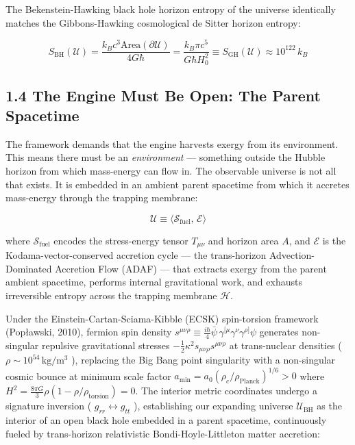 \documentclass[11pt,a4paper]{article}
\theoremstyle{definition}\newtheorem{definition}{Definition}
\theoremstyle{remark}\newtheorem{remark}{Remark}
\begin{document}
The Bekenstein-Hawking black hole horizon entropy of the universe identically matches the Gibbons-Hawking cosmological de Sitter horizon entropy:


\begin{equation}
\boxed{S_{\text{BH}}(\mathcal{U}) = \frac{k_B c^3 \mathrm{Area}(\partial \mathcal{U})}{4 G \hbar} = \frac{k_B \pi c^5}{G \hbar H_0^2} \equiv S_{\text{GH}}(\mathcal{U}) \approx 10^{122} \, k_B}
\end{equation}

\subsection{1.4 The Engine Must Be Open: The Parent Spacetime}

The framework demands that the engine harvests exergy from its environment. This means there must be an \textit{environment} — something outside the Hubble horizon from which mass-energy can flow in. The observable universe is not all that exists. It is embedded in an ambient parent spacetime from which it accretes mass-energy through the trapping membrane:


\begin{equation}
\boxed{\mathcal{U} \equiv \langle \mathcal{S}_{\text{fuel}},\, \mathcal{E} \rangle}
\end{equation}


where $\mathcal{S}_{\text{fuel}}$ encodes the stress-energy tensor $T_{\mu\nu}$ and horizon area $A$, and $\mathcal{E}$ is the Kodama-vector-conserved accretion cycle — the trans-horizon Advection-Dominated Accretion Flow (ADAF) — that extracts exergy from the parent ambient spacetime, performs internal gravitational work, and exhausts irreversible entropy across the trapping membrane $\mathcal{H}$.

Under the Einstein-Cartan-Sciama-Kibble (ECSK) spin-torsion framework (Popławski, 2010), fermion spin density $s^{\mu\nu\rho} \equiv \frac{i\hbar}{4}\bar{\psi} \, \gamma^{[\mu}\gamma^\nu\gamma^{\rho]}\psi$ generates non-singular repulsive gravitational stresses $-\frac{1}{2}\kappa^2 s_{\mu\nu\rho}s^{\mu\nu\rho}$ at trans-nuclear densities ( $\rho \sim 10^{54} \, \mathrm{kg/m^3}$ ), replacing the Big Bang point singularity with a non-singular cosmic bounce at minimum scale factor $a_{\text{min}} = a_0 (\rho_c / \rho_{\text{Planck}})^{1/6} > 0$ where $H^2 = \frac{8\pi G}{3}\rho(1 - \rho/\rho_{\text{torsion}}) = 0$. The interior metric coordinates undergo a signature inversion ( $g_{rr} \leftrightarrow g_{tt}$ ), establishing our expanding universe $\mathcal{U}_{\text{BH}}$ as the interior of an open black hole embedded in a parent spacetime, continuously fueled by trans-horizon relativistic Bondi-Hoyle-Littleton matter accretion:
\end{document}
